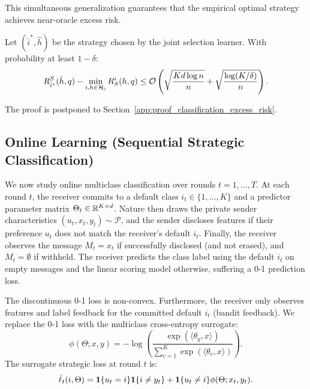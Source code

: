 This simultaneous generalization guarantees that the empirical optimal strategy achieves near-oracle excess risk.
\begin{theorem}
\label{thm:classification_excess_risk}
Let $(\hat{i}^*, \hat{h})$ be the strategy chosen by the joint selection learner. With probability at least $1 - \delta$:
\begin{equation}
    \label{eq:classification_excess_risk}
    R^S_{\hat{i}^*}(\hat{h}, q) - \min_{i, h \in \mathcal{H}_i} R^i_S(h, q) \le \mathcal{O}\left( \sqrt{\frac{K d \log n}{n}} + \sqrt{\frac{\log(K/\delta)}{n}} \right).
\end{equation}
\end{theorem}
The proof is postponed to Section~\ref{app:proof_classification_excess_risk}.

\subsection{Online Learning (Sequential Strategic Classification)}
\label{sec:classification_online}
We now study online multiclass classification over rounds $t = 1, \dots, T$. At each round $t$, the receiver commits to a default class $i_t \in \{1, \dots, K\}$ and a predictor parameter matrix $\Theta_t \in \mathbb{R}^{K \times d}$. Nature then draws the private sender characteristics $(u_t, x_t, y_t) \sim \mathcal{P}$, and the sender discloses features if their preference $u_t$ does not match the receiver's default $i_t$. Finally, the receiver observes the message $M_t = x_t$ if successfully disclosed (and not erased), and $M_t = \emptyset$ if withheld. The receiver predicts the class label using the default $i_t$ on empty messages and the linear scoring model otherwise, suffering a 0-1 prediction loss.


The discontinuous 0-1 loss is non-convex. Furthermore, the receiver only observes features and label feedback for the committed default $i_t$ (bandit feedback). We replace the 0-1 loss with the multiclass cross-entropy surrogate:
\begin{equation}
    \label{eq:cross_entropy_surrogate}
    \phi(\Theta; x, y) = -\log \left( \frac{\exp(\langle \theta_y, x \rangle)}{\sum_{c=1}^K \exp(\langle \theta_c, x \rangle)} \right).
\end{equation}
The surrogate strategic loss at round $t$ is:
\begin{equation}
    \label{eq:surrogate_strategic_loss_t}
    \tilde{\ell}_t(i, \Theta) = \mathbf{1}\{u_t = i\}\mathbf{1}\{i \ne y_t\} + \mathbf{1}\{u_t \ne i\} \phi(\Theta; x_t, y_t).
\end{equation}

